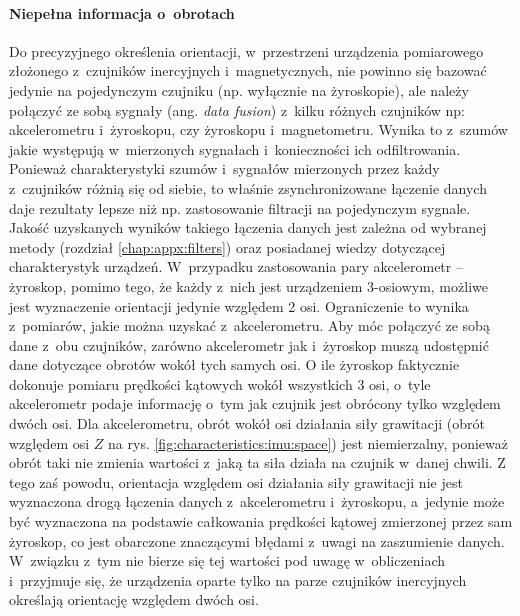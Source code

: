 \paragraph*{Niepełna informacja o~obrotach}
Do precyzyjnego określenia orientacji, w~przestrzeni urządzenia pomiarowego złożonego z~czujników inercyjnych i~magnetycznych, nie powinno się bazować jedynie na pojedynczym czujniku (np. wyłącznie na żyroskopie), ale należy połączyć ze sobą sygnały (ang. \emph{data fusion}) z~kilku różnych czujników np: akcelerometru i~żyroskopu, czy żyroskopu i~magnetometru. Wynika to z~szumów jakie występują w~mierzonych sygnałach i~konieczności ich odfiltrowania. Ponieważ charakterystyki szumów i~sygnałów mierzonych przez każdy z~czujników różnią się od siebie, to właśnie zsynchronizowane łączenie danych daje rezultaty lepsze niż np. zastosowanie filtracji na pojedynczym sygnale. Jakość uzyskanych wyników takiego łączenia danych jest zależna od wybranej metody (rozdział \ref{chap:appx:filters}) oraz posiadanej wiedzy dotyczącej charakterystyk urządzeń. W~przypadku zastosowania pary akcelerometr -- żyroskop, pomimo tego, że każdy z~nich jest urządzeniem 3-osiowym, możliwe jest wyznaczenie orientacji jedynie względem 2 osi. Ograniczenie to wynika z~pomiarów, jakie można uzyskać z~akcelerometru. Aby móc połączyć ze sobą dane z~obu czujników, zarówno akcelerometr jak i~żyroskop muszą udostępnić dane dotyczące obrotów wokół tych samych osi. O ile żyroskop faktycznie dokonuje pomiaru prędkości kątowych wokół wszystkich 3 osi, o~tyle akcelerometr podaje informację o~tym jak czujnik jest obrócony tylko względem dwóch osi. Dla akcelerometru, obrót wokół osi działania siły grawitacji (obrót względem osi $Z$ na rys. \ref{fig:characteristics:imu:space}) jest niemierzalny, ponieważ obrót taki nie zmienia wartości z~jaką ta siła działa na czujnik w~danej chwili. Z tego zaś powodu, orientacja względem osi działania siły grawitacji nie jest wyznaczona drogą łączenia danych z~akcelerometru i~żyroskopu, a~jedynie może być wyznaczona na podstawie całkowania prędkości kątowej zmierzonej przez sam żyroskop, co jest obarczone znaczącymi błędami z~uwagi na zaszumienie danych. W~związku z~tym nie bierze się tej wartości pod uwagę w~obliczeniach i~przyjmuje się, że urządzenia oparte tylko na parze czujników inercyjnych określają orientację względem dwóch osi.\\
																																															
